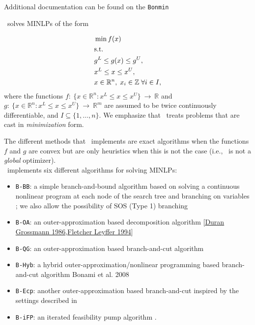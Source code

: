Additional documentation can be found on the {\tt Bonmin}


\Bonmin\ solves MINLPs of the form

\begin{align*}
&\min f(x) \\
& {\rm s.t.} \\
&g^L \leq g(x) \leq g^U,\\
& x^L \leq x \leq x^U, \\
&x \in \mathbb{R}^n, \;  x_i \in \mathbb{Z} \; \forall i \in I,
\end{align*}
where the functions $f :~\{x\in \mathbb{R}^n : x^L \leq x \leq x^U
\}~ \rightarrow~\mathbb{R}$ and $g:~\{x\in \mathbb{R}^n : x^L \leq x
\leq x^U \}~\rightarrow~\mathbb{R}^m$ are assumed to be twice
continuously differentiable, and $I \subseteq \{1, \ldots,n \}$. We
emphasize that \Bonmin\ treats problems that are cast
in {\em minimization} form.

The different methods that \Bonmin\ implements are exact algorithms when the functions $f$ and $g$ are
convex but are only heuristics when this is not the case (i.e., \Bonmin\ is not a \emph{global} optimizer).\\

\Bonmin\ implements six different algorithms for solving
MINLPs:

\begin{itemize}
\item {\tt B-BB}: a simple branch-and-bound algorithm based on solving
a continuous nonlinear program at each node of the search tree and
branching on variables ;
we also allow the possibility of SOS (Type 1) branching
\item {\tt B-OA}: an outer-approximation based decomposition algorithm
{[\href{\DGLink}{Duran Grossmann 1986},\href{\FLLink}{Fletcher Leyffer 1994}]}
\item {\tt B-QG}: an outer-approximation based branch-and-cut
algorithm
\item {\tt B-Hyb}: a hybrid outer-approximation/nonlinear programming
based branch-and-cut algorithm 
{\BetalLink}{Bonami et al. 2008}
\item {\tt B-Ecp}: another outer-approximation based branch-and-cut inspired
by the settings described in 
\item {\tt B-iFP}: an iterated feasibility pump algorithm .
\end{itemize}


